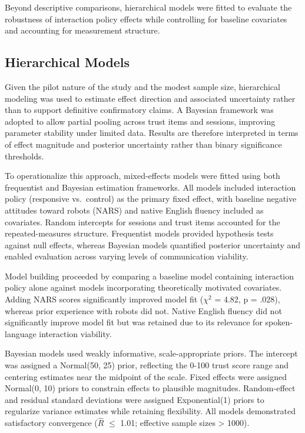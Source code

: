 \documentclass[
]{article}
\begin{document}
Beyond descriptive comparisons, hierarchical models were fitted to
evaluate the robustness of interaction policy effects while controlling
for baseline covariates and accounting for measurement structure.

\subsection{Hierarchical Models}\label{hierarchical-models}

Given the pilot nature of the study and the modest sample size,
hierarchical modeling was used to estimate effect direction and
associated uncertainty rather than to support definitive confirmatory
claims. A Bayesian framework was adopted to allow partial pooling across
trust items and sessions, improving parameter stability under limited
data. Results are therefore interpreted in terms of effect magnitude and
posterior uncertainty rather than binary significance thresholds.

To operationalize this approach, mixed-effects models were fitted using
both frequentist and Bayesian estimation frameworks. All models included
interaction policy (responsive vs.~control) as the primary fixed effect,
with baseline negative attitudes toward robots (NARS) and native English
fluency included as covariates. Random intercepts for sessions and trust
items accounted for the repeated-measures structure. Frequentist models
provided hypothesis tests against null effects, whereas Bayesian models
quantified posterior uncertainty and enabled evaluation across varying
levels of communication viability.

Model building proceeded by comparing a baseline model containing
interaction policy alone against models incorporating theoretically
motivated covariates. Adding NARS scores significantly improved model
fit (\(\chi^2\) = 4.82, p = .028), whereas prior experience with robots
did not. Native English fluency did not significantly improve model fit
but was retained due to its relevance for spoken-language interaction
viability.

Bayesian models used weakly informative, scale-appropriate priors. The
intercept was assigned a Normal(50, 25) prior, reflecting the 0-100
trust score range and centering estimates near the midpoint of the
scale. Fixed effects were assigned Normal(0, 10) priors to constrain
effects to plausible magnitudes. Random-effect and residual standard
deviations were assigned Exponential(1) priors to regularize variance
estimates while retaining flexibility. All models demonstrated
satisfactory convergence (\(\hat{R}\) \(\leq\) 1.01; effective sample
sizes \textgreater{} 1000).
\end{document}
